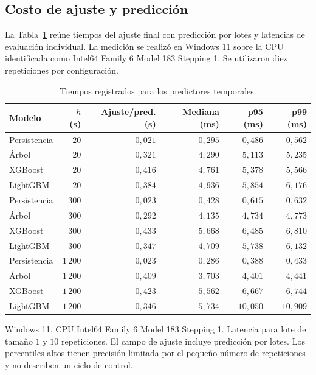 \subsection{Costo de ajuste y predicción}

La Tabla~\ref{tab:res_costo_ml} reúne tiempos del ajuste final con predicción por lotes y latencias de evaluación individual. La medición se realizó en Windows 11 sobre la CPU identificada como Intel64 Family 6 Model 183 Stepping 1. Se utilizaron diez repeticiones por configuración.

\begin{table}[htbp]
\centering
\caption{Tiempos registrados para los predictores temporales.}
\label{tab:res_costo_ml}
\small
\setlength{\tabcolsep}{5pt}
\begin{tabular}{lrrrrr}
\toprule
Modelo & $h$ (s) & Ajuste/pred. (s) & Mediana (ms) & p95 (ms) & p99 (ms) \\
\midrule
Persistencia & $20$ & $0{,}021$ & $0{,}295$ & $0{,}486$ & $0{,}562$ \\
Árbol & $20$ & $0{,}321$ & $4{,}290$ & $5{,}113$ & $5{,}235$ \\
XGBoost & $20$ & $0{,}416$ & $4{,}761$ & $5{,}378$ & $5{,}566$ \\
LightGBM & $20$ & $0{,}384$ & $4{,}936$ & $5{,}854$ & $6{,}176$ \\
Persistencia & $300$ & $0{,}023$ & $0{,}428$ & $0{,}615$ & $0{,}632$ \\
Árbol & $300$ & $0{,}292$ & $4{,}135$ & $4{,}734$ & $4{,}773$ \\
XGBoost & $300$ & $0{,}433$ & $5{,}668$ & $6{,}485$ & $6{,}810$ \\
LightGBM & $300$ & $0{,}347$ & $4{,}709$ & $5{,}738$ & $6{,}132$ \\
Persistencia & $1\,200$ & $0{,}023$ & $0{,}286$ & $0{,}388$ & $0{,}433$ \\
Árbol & $1\,200$ & $0{,}409$ & $3{,}703$ & $4{,}401$ & $4{,}441$ \\
XGBoost & $1\,200$ & $0{,}423$ & $5{,}562$ & $6{,}667$ & $6{,}744$ \\
LightGBM & $1\,200$ & $0{,}346$ & $5{,}734$ & $10{,}050$ & $10{,}909$ \\
\bottomrule
\end{tabular}
\par\vspace{3pt}
\begin{minipage}{0.98\textwidth}\footnotesize
Windows 11, CPU Intel64 Family 6 Model 183 Stepping 1. Latencia para lote de tamaño $1$ y $10$ repeticiones. El campo de ajuste incluye predicción por lotes. Los percentiles altos tienen precisión limitada por el pequeño número de repeticiones y no describen un ciclo de control.
\end{minipage}
\end{table}


